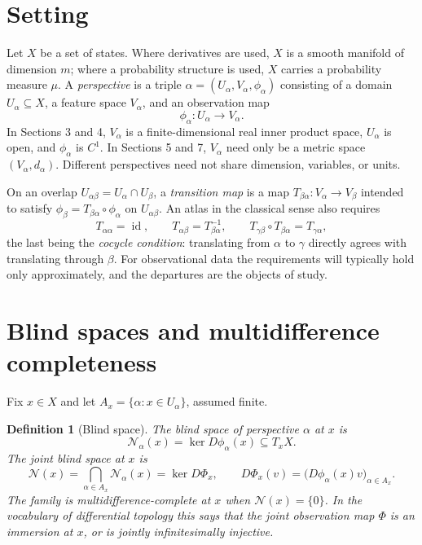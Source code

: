 \documentclass[11pt]{article}
\newtheorem{definition}{Definition}
\theoremstyle{remark}
\newcommand{\N}{\mathcal{N}}
\newcommand{\id}{\operatorname{id}}
\begin{document}
\section{Setting}

Let $X$ be a set of states. Where derivatives are used, $X$ is a smooth manifold of dimension $m$; where a probability structure is used, $X$ carries a probability measure $\mu$. A \emph{perspective} is a triple $\alpha=(U_\alpha,V_\alpha,\phi_\alpha)$ consisting of a domain $U_\alpha\subseteq X$, a feature space $V_\alpha$, and an observation map
\[
\phi_\alpha:U_\alpha\longrightarrow V_\alpha .
\]
In Sections 3 and 4, $V_\alpha$ is a finite-dimensional real inner product space, $U_\alpha$ is open, and $\phi_\alpha$ is $C^1$. In Sections 5 and 7, $V_\alpha$ need only be a metric space $(V_\alpha,d_\alpha)$. Different perspectives need not share dimension, variables, or units.

On an overlap $U_{\alpha\beta}=U_\alpha\cap U_\beta$, a \emph{transition map} is a map $T_{\beta\alpha}:V_\alpha\to V_\beta$ intended to satisfy $\phi_\beta=T_{\beta\alpha}\circ\phi_\alpha$ on $U_{\alpha\beta}$. An atlas in the classical sense also requires
\[
T_{\alpha\alpha}=\id,\qquad T_{\alpha\beta}=T_{\beta\alpha}^{-1},\qquad T_{\gamma\beta}\circ T_{\beta\alpha}=T_{\gamma\alpha},
\]
the last being the \emph{cocycle condition}: translating from $\alpha$ to $\gamma$ directly agrees with translating through $\beta$. For observational data the requirements will typically hold only approximately, and the departures are the objects of study.

\section{Blind spaces and multidifference completeness}

Fix $x\in X$ and let $A_x=\{\alpha:x\in U_\alpha\}$, assumed finite.

\begin{definition}[Blind space]
The \emph{blind space} of perspective $\alpha$ at $x$ is
\[
\N_\alpha(x)=\ker D\phi_\alpha(x)\subseteq T_xX .
\]
The \emph{joint blind space} at $x$ is
\[
\N(x)=\bigcap_{\alpha\in A_x}\N_\alpha(x)=\ker D\Phi_x,
\qquad
D\Phi_x(v)=\bigl(D\phi_\alpha(x)v\bigr)_{\alpha\in A_x}.
\]
The family is \emph{multidifference-complete at $x$} when $\N(x)=\{0\}$. In the vocabulary of differential topology this says that the joint observation map $\Phi$ is an immersion at $x$, or is jointly infinitesimally injective.
\end{definition}
\end{document}

